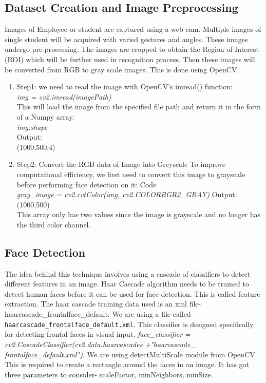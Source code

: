   \subsection{Dataset Creation and Image Preprocessing}
  
 Images of Employee or student are captured using a web cam. Multiple images of single student will be acquired with varied gestures and  angles.  These  images  undergo  pre-processing.  The images  are cropped  to obtain  the  Region of  Interest (ROI) which will be further used in recognition process. Then these  images  will  be  converted  from  RGB  to  gray  scale images. This is done using OpenCV. 
\begin{enumerate}
    \item Step1: we need to read the image with OpenCV’s imread() function:
    \\
  \emph{img = cv2.imread(imagePath)} \\
    This will load the image from the specified file path and return it in the form of a Numpy array. \\
   \emph{img.shape} \\
    Output:\\
    (1000,500,4)
    \item Step2: Convert the RGB data of Image into Greyscale
    To improve computational efficiency, we first need to convert this image to grayscale before performing face detection on it:
    Code \\
   \emph{gray\_image = cv2.cvtColor(img, cv2.COLORBGR2\_GRAY)} 
    Output:
    \\
    (1000,500)\\
    This array only has two values since the image is grayscale and no longer has the third color channel.
\end{enumerate}

  \subsection{Face Detection}
The idea behind this technique involves using a cascade of classifiers to detect different features in an image. Haar Cascade algorithm needs to be trained to  detect human  faces before it can be used for  face detection. This is called feature extraction. The haar cascade training  data  used  is  an  xml  file- haarcascade\_frontalface\_default. We are using a file called \verb|haarcascade_frontalface_|\linebreak\verb|default.xml|.
This classifier is designed specifically for detecting frontal faces in visual input. \emph{face\_classifier = cv2.CascadeClassifier(cv2.data.haarcascades +"haarcascade\_ frontalface\_default.xml")}. We are using detectMultiScale module from OpenCV. This is required to create a rectangle around  the faces  in an image.  It has got three  parameters to  consider-  scaleFactor, minNeighbors, minSize.

